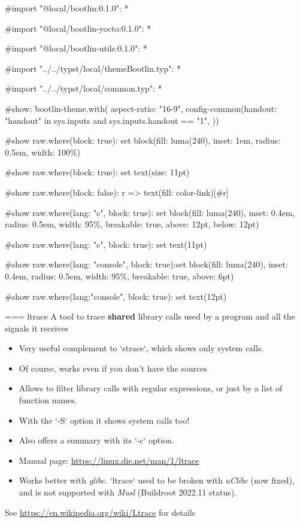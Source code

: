 #import "@local/bootlin:0.1.0": *

#import "@local/bootlin-yocto:0.1.0": *

#import "@local/bootlin-utils:0.1.0": *

#import "../../typst/local/themeBootlin.typ": *

#import "../../typst/local/common.typ": *

#show: bootlin-theme.with( aspect-ratio: "16-9", config-common(handout: "handout" in sys.inputs and sys.inputs.handout == "1", ))

#show raw.where(block: true): set block(fill: luma(240), inset: 1em, radius: 0.5em, width: 100\%)

#show raw.where(block: true): set text(size: 11pt)

#show raw.where(block: false): r => text(fill: color-link)[#r]

#show raw.where(lang: "c", block: true): set block(fill: luma(240), inset: 0.4em, radius: 0.5em, width: 95\%, breakable: true, above: 12pt, below: 12pt)

#show raw.where(lang: "c", block: true): set text(11pt)

#show raw.where(lang: "console", block: true):set block(fill: luma(240), inset: 0.4em, radius: 0.5em, width: 95\%, breakable: true, above: 6pt)

#show raw.where(lang:"console", block: true): set text(12pt)

=== {ltrace}
  A tool to trace {\bf shared} library calls used by a program and all the signals
  it receives
  \begin{itemize}
  \item Very useful complement to `strace`, which shows only system
    calls.
  \item Of course, works even if you don't have the sources
  \item Allows to filter library calls with regular expressions, or
    just by a list of function names.
  \item With the `-S` option it shows system calls too!
  \item Also offers a summary with its `-c` option.
  \item Manual page: \url{https://linux.die.net/man/1/ltrace}
  \item Works better with {\em glibc}. `ltrace` used to be broken
        with {\em uClibc} (now fixed), and is not supported
        with {\em Musl} (Buildroot 2022.11 status).
  \end{itemize}
  See \url{https://en.wikipedia.org/wiki/Ltrace} for details


